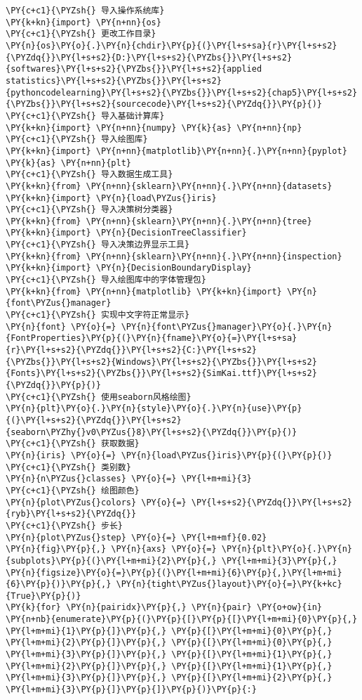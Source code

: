 \begin{Verbatim}[commandchars=\\\{\}]
\PY{c+c1}{\PYZsh{} 导入操作系统库}
\PY{k+kn}{import} \PY{n+nn}{os}
\PY{c+c1}{\PYZsh{} 更改工作目录}
\PY{n}{os}\PY{o}{.}\PY{n}{chdir}\PY{p}{(}\PY{l+s+sa}{r}\PY{l+s+s2}{\PYZdq{}}\PY{l+s+s2}{D:}\PY{l+s+s2}{\PYZbs{}}\PY{l+s+s2}{softwares}\PY{l+s+s2}{\PYZbs{}}\PY{l+s+s2}{applied statistics}\PY{l+s+s2}{\PYZbs{}}\PY{l+s+s2}{pythoncodelearning}\PY{l+s+s2}{\PYZbs{}}\PY{l+s+s2}{chap5}\PY{l+s+s2}{\PYZbs{}}\PY{l+s+s2}{sourcecode}\PY{l+s+s2}{\PYZdq{}}\PY{p}{)}
\PY{c+c1}{\PYZsh{} 导入基础计算库}
\PY{k+kn}{import} \PY{n+nn}{numpy} \PY{k}{as} \PY{n+nn}{np}
\PY{c+c1}{\PYZsh{} 导入绘图库}
\PY{k+kn}{import} \PY{n+nn}{matplotlib}\PY{n+nn}{.}\PY{n+nn}{pyplot} \PY{k}{as} \PY{n+nn}{plt}
\PY{c+c1}{\PYZsh{} 导入数据生成工具}
\PY{k+kn}{from} \PY{n+nn}{sklearn}\PY{n+nn}{.}\PY{n+nn}{datasets} \PY{k+kn}{import} \PY{n}{load\PYZus{}iris}
\PY{c+c1}{\PYZsh{} 导入决策树分类器}
\PY{k+kn}{from} \PY{n+nn}{sklearn}\PY{n+nn}{.}\PY{n+nn}{tree} \PY{k+kn}{import} \PY{n}{DecisionTreeClassifier}
\PY{c+c1}{\PYZsh{} 导入决策边界显示工具}
\PY{k+kn}{from} \PY{n+nn}{sklearn}\PY{n+nn}{.}\PY{n+nn}{inspection} \PY{k+kn}{import} \PY{n}{DecisionBoundaryDisplay}
\PY{c+c1}{\PYZsh{} 导入绘图库中的字体管理包}
\PY{k+kn}{from} \PY{n+nn}{matplotlib} \PY{k+kn}{import} \PY{n}{font\PYZus{}manager}
\PY{c+c1}{\PYZsh{} 实现中文字符正常显示}
\PY{n}{font} \PY{o}{=} \PY{n}{font\PYZus{}manager}\PY{o}{.}\PY{n}{FontProperties}\PY{p}{(}\PY{n}{fname}\PY{o}{=}\PY{l+s+sa}{r}\PY{l+s+s2}{\PYZdq{}}\PY{l+s+s2}{C:}\PY{l+s+s2}{\PYZbs{}}\PY{l+s+s2}{Windows}\PY{l+s+s2}{\PYZbs{}}\PY{l+s+s2}{Fonts}\PY{l+s+s2}{\PYZbs{}}\PY{l+s+s2}{SimKai.ttf}\PY{l+s+s2}{\PYZdq{}}\PY{p}{)}
\PY{c+c1}{\PYZsh{} 使用seaborn风格绘图}
\PY{n}{plt}\PY{o}{.}\PY{n}{style}\PY{o}{.}\PY{n}{use}\PY{p}{(}\PY{l+s+s2}{\PYZdq{}}\PY{l+s+s2}{seaborn\PYZhy{}v0\PYZus{}8}\PY{l+s+s2}{\PYZdq{}}\PY{p}{)}
\PY{c+c1}{\PYZsh{} 获取数据}
\PY{n}{iris} \PY{o}{=} \PY{n}{load\PYZus{}iris}\PY{p}{(}\PY{p}{)}
\PY{c+c1}{\PYZsh{} 类别数}
\PY{n}{n\PYZus{}classes} \PY{o}{=} \PY{l+m+mi}{3}
\PY{c+c1}{\PYZsh{} 绘图颜色}
\PY{n}{plot\PYZus{}colors} \PY{o}{=} \PY{l+s+s2}{\PYZdq{}}\PY{l+s+s2}{ryb}\PY{l+s+s2}{\PYZdq{}}
\PY{c+c1}{\PYZsh{} 步长}
\PY{n}{plot\PYZus{}step} \PY{o}{=} \PY{l+m+mf}{0.02}
\PY{n}{fig}\PY{p}{,} \PY{n}{axs} \PY{o}{=} \PY{n}{plt}\PY{o}{.}\PY{n}{subplots}\PY{p}{(}\PY{l+m+mi}{2}\PY{p}{,} \PY{l+m+mi}{3}\PY{p}{,} \PY{n}{figsize}\PY{o}{=}\PY{p}{(}\PY{l+m+mi}{6}\PY{p}{,}\PY{l+m+mi}{6}\PY{p}{)}\PY{p}{,} \PY{n}{tight\PYZus{}layout}\PY{o}{=}\PY{k+kc}{True}\PY{p}{)}
\PY{k}{for} \PY{n}{pairidx}\PY{p}{,} \PY{n}{pair} \PY{o+ow}{in} \PY{n+nb}{enumerate}\PY{p}{(}\PY{p}{[}\PY{p}{[}\PY{l+m+mi}{0}\PY{p}{,} \PY{l+m+mi}{1}\PY{p}{]}\PY{p}{,} \PY{p}{[}\PY{l+m+mi}{0}\PY{p}{,} \PY{l+m+mi}{2}\PY{p}{]}\PY{p}{,} \PY{p}{[}\PY{l+m+mi}{0}\PY{p}{,} \PY{l+m+mi}{3}\PY{p}{]}\PY{p}{,} \PY{p}{[}\PY{l+m+mi}{1}\PY{p}{,} \PY{l+m+mi}{2}\PY{p}{]}\PY{p}{,} \PY{p}{[}\PY{l+m+mi}{1}\PY{p}{,} \PY{l+m+mi}{3}\PY{p}{]}\PY{p}{,} \PY{p}{[}\PY{l+m+mi}{2}\PY{p}{,} \PY{l+m+mi}{3}\PY{p}{]}\PY{p}{]}\PY{p}{)}\PY{p}{:}

\end{Verbatim}
